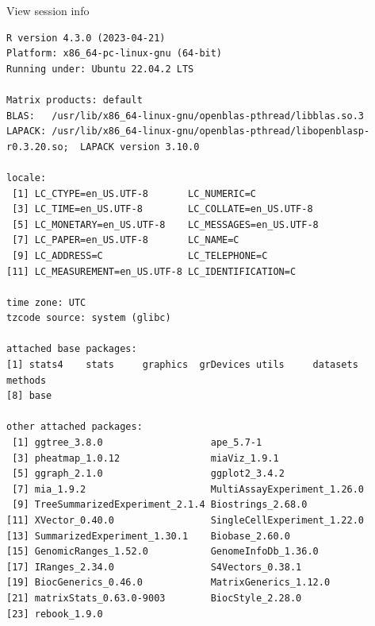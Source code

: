 \documentclass[
]{book}
\begin{document}
View session info

\begin{verbatim}
R version 4.3.0 (2023-04-21)
Platform: x86_64-pc-linux-gnu (64-bit)
Running under: Ubuntu 22.04.2 LTS

Matrix products: default
BLAS:   /usr/lib/x86_64-linux-gnu/openblas-pthread/libblas.so.3 
LAPACK: /usr/lib/x86_64-linux-gnu/openblas-pthread/libopenblasp-r0.3.20.so;  LAPACK version 3.10.0

locale:
 [1] LC_CTYPE=en_US.UTF-8       LC_NUMERIC=C              
 [3] LC_TIME=en_US.UTF-8        LC_COLLATE=en_US.UTF-8    
 [5] LC_MONETARY=en_US.UTF-8    LC_MESSAGES=en_US.UTF-8   
 [7] LC_PAPER=en_US.UTF-8       LC_NAME=C                 
 [9] LC_ADDRESS=C               LC_TELEPHONE=C            
[11] LC_MEASUREMENT=en_US.UTF-8 LC_IDENTIFICATION=C       

time zone: UTC
tzcode source: system (glibc)

attached base packages:
[1] stats4    stats     graphics  grDevices utils     datasets  methods  
[8] base     

other attached packages:
 [1] ggtree_3.8.0                   ape_5.7-1                     
 [3] pheatmap_1.0.12                miaViz_1.9.1                  
 [5] ggraph_2.1.0                   ggplot2_3.4.2                 
 [7] mia_1.9.2                      MultiAssayExperiment_1.26.0   
 [9] TreeSummarizedExperiment_2.1.4 Biostrings_2.68.0             
[11] XVector_0.40.0                 SingleCellExperiment_1.22.0   
[13] SummarizedExperiment_1.30.1    Biobase_2.60.0                
[15] GenomicRanges_1.52.0           GenomeInfoDb_1.36.0           
[17] IRanges_2.34.0                 S4Vectors_0.38.1              
[19] BiocGenerics_0.46.0            MatrixGenerics_1.12.0         
[21] matrixStats_0.63.0-9003        BiocStyle_2.28.0              
[23] rebook_1.9.0                  


\end{verbatim}
\end{document}
